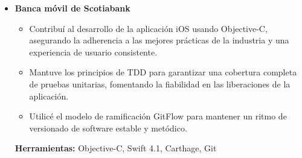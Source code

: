 \documentclass[11pt,a4paper,english]{moderncv}
\begin{document}
{\begin{itemize}
\begin{itemize}
            \item Innové un robusto pipeline de despliegue continuo utilizando CircleCI y AWS EKS para agilizar la entrega de software.
            \item Mejoré el rendimiento descargando tareas computacionalmente intensivas a trabajos de Celery, optimizando operaciones asíncronas.
            \item Desarrollé un sistema automatizado de moderación de contenido utilizando AWS Rekognition y Azure Cognitive Services que mantuvo la calidad y el cumplimiento del contenido.
        \end{itemize}
        \textbf{Herramientas:} Python, asyncio, Flask, SQLAlchemy, MySQL, MongoDB, Mock, Git, Docker
    \item \textbf{Banca móvil de Scotiabank}
        \begin{itemize}
            \item Contribuí al desarrollo de la aplicación iOS usando Objective-C, asegurando la adherencia a las mejores prácticas de la industria y una experiencia de usuario consistente.
            \item Mantuve los principios de TDD para garantizar una cobertura completa de pruebas unitarias, fomentando la fiabilidad en las liberaciones de la aplicación.
            \item Utilicé el modelo de ramificación GitFlow para mantener un ritmo de versionado de software estable y metódico.
        \end{itemize}
        \textbf{Herramientas:} Objective-C, Swift 4.1, Carthage, Git
\end{itemize}
}

\subsection{}
\end{document}
